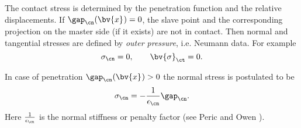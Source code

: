 
The contact stress is determined by the penetration function and the relative displacements.
If $\gap_{\cn}(\bv{x}^{\sl}) = 0$, the slave point and the corresponding projection on the master side (if it exists) are not in contact. Then normal and tangential stresses are defined by \textit{outer pressure}, i.e. Neumann data. For example
\begin{equation}
\sigma_{\cn} = 0, \qquad \bv{\sigma}_{\ct} = 0.
\end{equation} 

In case of penetration $\gap_{\cn}(\bv{x}^{\sl}) > 0$ the normal stress is postulated to be 
\begin{equation*}
\sigma_{\cn}=-{\frac{1}{\epsilon_{\cn}}} \gap_{\cn}.
\end{equation*}
Here ${\frac{1}{\epsilon_{\cn}}}$ is the normal stiffness or penalty factor (see Peric and Owen \cite{PeOw98}).

